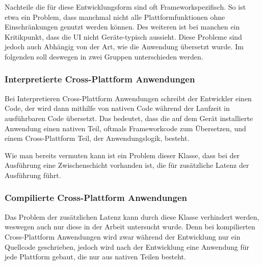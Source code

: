 Nachteile die für diese Entwicklungsform sind oft Frameworkspezifisch. So ist etwa ein Problem, dass manchmal nicht alle Plattformfunktionen ohne Einschränkungen genutzt werden können. Des weiteren ist bei manchen ein Kritikpunkt, dass die UI nicht Geräte-typisch aussieht. Diese Probleme sind jedoch auch Abhängig von der Art, wie die Anwendung übersetzt wurde. Im folgenden soll deswegen in zwei Gruppen unterschieden werden.

\subsubsection{Interpretierte Cross-Plattform Anwendungen}
Bei Interpretieren Cross-Plattform Anwendungen schreibt der Entwickler einen Code, der wird dann mithilfe von nativen Code während der Laufzeit in ausführbaren Code übersetzt. Das bedeutet, dass die auf dem Gerät installierte Anwendung einen nativen Teil, oftmals Frameworkcode zum Übersetzen, und einem Cross-Plattform Teil, der Anwendungslogik, besteht. \cite{IEEE_development_classes}

Wie man bereits vermuten kann ist ein Problem dieser Klasse, dass bei der Ausführung eine Zwischenschicht vorhanden ist, die für zusätzliche Latenz der Ausführung führt.

\subsubsection{Compilierte Cross-Plattform Anwendungen}
Das Problem der zusätzlichen Latenz kann durch diese Klasse verhindert werden, weswegen auch nur diese in der Arbeit untersucht wurde. Denn bei kompilierten Cross-Plattform Anwendungen wird zwar während der Entwicklung nur ein Quellcode geschrieben, jedoch wird nach der Entwicklung eine Anwendung für jede Plattform gebaut, die nur aus nativen Teilen besteht.\cite{IEEE_development_classes}
